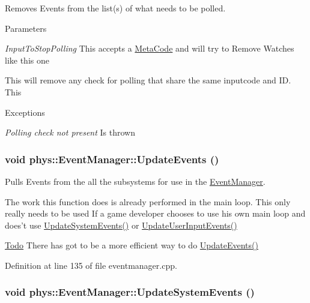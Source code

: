 Removes Events from the list(s) of what needs to be polled. 


\begin{DoxyParams}{Parameters}
\item[{\em InputToStopPolling}]This accepts a \hyperlink{classphys_1_1MetaCode}{MetaCode} and will try to Remove Watches like this one\end{DoxyParams}
This will remove any check for polling that share the same inputcode and ID. This 
\begin{DoxyExceptions}{Exceptions}
\item[{\em Polling check not present}]Is thrown \end{DoxyExceptions}
\hypertarget{classphys_1_1EventManager_a63cf23dc9fe0ced3e2c60ca61c97b166}{
\subsubsection[{UpdateEvents}]{\setlength{\rightskip}{0pt plus 5cm}void phys::EventManager::UpdateEvents ()}}
\label{da/dde/classphys_1_1EventManager_a63cf23dc9fe0ced3e2c60ca61c97b166}


Pulls Events from the all the subsystems for use in the \hyperlink{classphys_1_1EventManager}{EventManager}. 

The work this function does is already performed in the main loop. This only really needs to be used If a game developer chooses to use his own main loop and does't use \hyperlink{classphys_1_1EventManager_a0cf574c55def063d66d7db46a4d3e8a5}{UpdateSystemEvents()} or \hyperlink{classphys_1_1EventManager_a01a5a131ac26679eee5dcf5dd514045c}{UpdateUserInputEvents()} 

\begin{Desc}
\item[\hyperlink{todo__todo000003}{Todo}]There has got to be a more efficient way to do \hyperlink{classphys_1_1EventManager_a63cf23dc9fe0ced3e2c60ca61c97b166}{UpdateEvents()} \end{Desc}




Definition at line 135 of file eventmanager.cpp.

\hypertarget{classphys_1_1EventManager_a0cf574c55def063d66d7db46a4d3e8a5}{
\subsubsection[{UpdateSystemEvents}]{\setlength{\rightskip}{0pt plus 5cm}void phys::EventManager::UpdateSystemEvents ()}}
\label{da/dde/classphys_1_1EventManager_a0cf574c55def063d66d7db46a4d3e8a5}


